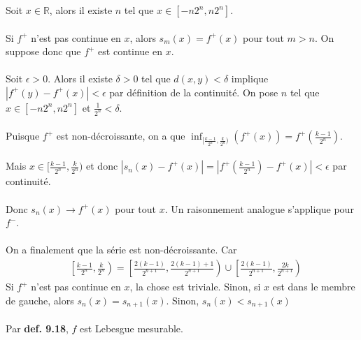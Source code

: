\documentclass[a4paper,10pt]{article}
\begin{document}
Soit $x \in \mathbb{R}$, alors il existe $n$ tel que $x \in [-n2^n, n2^n]$. 
\\
\\
Si $f^+$ n'est pas continue en $x$, alors $s_m(x) = f^+(x)$ pour tout $m > n$. On suppose donc que $f^+$ est continue en $x$.
\\
\\
Soit $\epsilon > 0$. Alors il existe $\delta > 0$ tel que $d(x,y) < \delta$ implique $|f^+(y) - f^+(x)| < \epsilon$ par définition de la continuité. On pose $n$ tel que $x \in [-n2^n, n2^n]$ et $\frac{1}{2^n} < \delta$. 
\\
\\
Puisque $f^+$ est non-décroissante, on a que $\inf_{[\frac{k-1}{2^n}, \frac{k}{2^n})} (f^+(x)) = f^+(\frac{k-1}{2^n})$. 
\\
\\
Mais $x \in [\frac{k-1}{2^n}, \frac{k}{2^n})$ et donc $|s_n (x) - f^+(x)| = |f^+(\frac{k-1}{2^n}) - f^+(x)| < \epsilon$ par continuité. 
\\
\\
Donc $s_n (x) \rightarrow f^+(x)$ pour tout $x$. Un raisonnement analogue s'applique pour $f^-$.
\\
\\
On a finalement que la série est non-décroissante. Car
\begin{align*}
	& \left [\frac{k-1}{2^n}, \frac{k}{2^n} \right ) = \left [\frac{2(k-1)}{2^{n+1}}, \frac{2(k-1) + 1}{2^{n+1}} \right ) \cup \left [\frac{2(k-1)}{2^{n+1}}, \frac{2k}{2^{n+1}} \right )
\end{align*}
Si $f^+$ n'est pas continue en $x$, la chose est triviale. Sinon, si $x$ est dans le membre de gauche, alors $s_n(x) = s_{n+1} (x)$. Sinon, $s_n(x) < s_{n+1}(x)$
\\
\\
Par \textbf{def. 9.18}, $f$ est Lebesgue mesurable.
\end{document}
